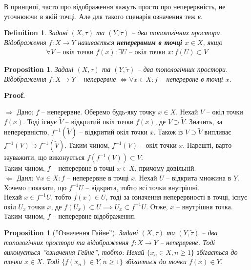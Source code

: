 \documentclass[a4paper, 10pt]{article}
\makeatletter
\def\rightproof{$\boxed{\Rightarrow}$ }
\def\leftproof{$\boxed{\Leftarrow}$ }
\theoremstyle{theoremdd}
\newtheorem{definition}[theorem]{Definition}
\newtheorem{proposition}[theorem]{Proposition}
\renewenvironment{proof}[1][Proof.\\]{\par
\pushQED{\hfill \qed}%
\normalfont \topsep6\p@\@plus6\p@\relax
\trivlist
\item\relax
{\bfseries
#1\@addpunct{.}}\hspace\labelsep\ignorespaces
}{%
\popQED\endtrivlist\@endpefalse
}
\makeatother
\begin{document}
\noindent В принципі, часто про відображення кажуть просто про неперервність, не уточнюючи в якій точці. Але для такого сценарія означення теж є.

\begin{definition}
Задані $(X,\tau)$ та $(Y,\tilde{\tau})$ -- два топологічних простори.\\
Відображення $f \colon X \to Y$ називається \textbf{неперервним в точці $x \in X$}, якщо
\begin{align*}
\forall V \text{ -- окіл точки } f(x) : \exists U \text{ -- окіл точки }x : f(U) \subset V
\end{align*}
\end{definition}

\begin{proposition}
Задані $(X,\tau)$ та $(Y,\tilde{\tau})$ -- два топологічних простори.\\
Відображення $f \colon X \to Y$ -- неперервне $\iff \forall x \in X: f $ -- неперервне в точці $x$.
\end{proposition}

\begin{proof}
\rightproof Дано: $f$ -- неперервне. Оберемо будь-яку точку $x \in X$. Нехай $V$ -- окіл точки $f(x)$. Тоді існує $\tilde{V}$ -- відкритий окіл точки $f(x)$, де $V \supset \tilde{V}$. Значить, за неперервністю, $f^{-1}(\tilde{V})$ -- відкритий окіл точки $x$. Також із $V \supset \tilde{V}$ випливає $f^{-1}(V) \supset f^{-1}(\tilde{V})$. Таким чином, $f^{-1}(V)$ -- окіл точки $x$. Нарешті, варто зауважити, що виконується $f(f^{-1}(V)) \subset V$.\\
Таким чином, $f$ -- неперервне в точці $x \in X$, причому довільній.
\bigskip \\
\leftproof Данл: $\forall x \in X: f $ -- неперервне в точці $x$. Нехай $U$ -- відкрита множина в $Y$. Хочемо показати, що $f^{-1}U$ -- відкрита, тобто всі точки внутрішні.\\
Нехай $x \in f^{-1}U$, тобто $f(x) \in U$, тоді за означення неперервності в точці, існує окіл $U_x$ точки $x$, де $f(U_x) \subset U \implies U_x \subset f^{-1}U$. Отже, $x$ -- внутрішня точка.\\
Таким чином, $f$ -- неперервне відображення.
\end{proof}

\begin{proposition}[''Означення Гайне'']
Задані $(X,\tau)$ та $(Y,\tilde{\tau})$ -- два топологічних простори та відображення $f \colon X \to Y$ -- неперервне. Тоді виконується ''означення Гейне'', тобто:
Нехай $\{x_n \in X, n \geq 1\}$ збігається до точки $x \in X$. Тоді $\{f(x_n) \in Y, n \geq 1\}$ збігається до точки $f(x) \in Y$.
\end{proposition}
\end{document}
